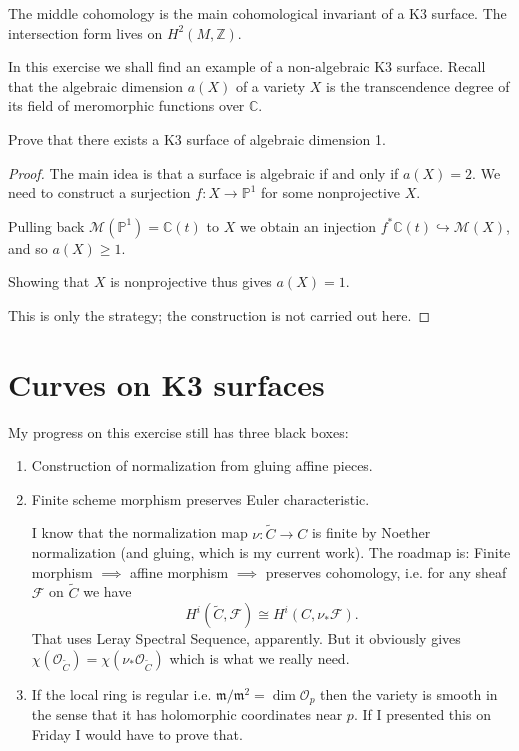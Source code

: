 \begin{remark}
The middle cohomology is the main
cohomological invariant of a K3
surface.
The intersection form lives on
$H^2(M,\mathbb{Z})$.
\end{remark}

\medskip\noindent
In this exercise we shall find
an example of a non-algebraic K3 surface.
Recall that the algebraic dimension $a(X)$
of a variety $X$ is the transcendence
degree of its field of meromorphic
functions over $\mathbb{C}$.

\begin{exercise}
\label{exercise-k3-algebraic-dimension}
Prove that there exists a K3 surface
of algebraic dimension 1.
\end{exercise}

\begin{proof}
The main idea is that a surface
is algebraic if and only if $a(X) = 2$.
We need to construct a surjection
$f:X \to \mathbb{P}^1$
for some nonprojective $X$.

Pulling back
$\mathcal{M}(\mathbb{P}^1)=\mathbb{C}(t)$
to $X$ we obtain an injection
$f^*\mathbb{C}(t)\hookrightarrow\mathcal{M}(X)$,
and so $a(X) \geq 1$.

Showing that $X$ is nonprojective
thus gives $a(X) = 1$.

This is only the strategy; the
construction is not carried out here.
\end{proof}

\section{Curves on K3 surfaces}
\label{section-curves-on-k3}

\noindent
My progress on this
exercise still has three black boxes:
\begin{enumerate}
\item Construction of normalization
from gluing affine pieces.
\item Finite scheme morphism preserves Euler
characteristic.
 
I know that the normalization map 
$\nu:\widetilde C\to C$
is finite by Noether normalization
(and gluing, which is my current work).
The roadmap is:
Finite morphism $\implies$
affine morphism $\implies$
preserves cohomology, i.e.
for any sheaf $\mathcal{F}$ on
$\widetilde C$ we have
$$
H^i(\widetilde C, \mathcal{F})
\cong H^i(C,\nu_*\mathcal{F}).
$$
That uses Leray Spectral Sequence,
apparently.
But it obviously gives
$\chi(\mathcal{O}_{\widetilde{C}})
=\chi (\nu_*\mathcal{O}_{\widetilde{C}})$
which is what we really need.
\item If the local ring is regular
i.e. $\mathfrak{m}/\mathfrak{m}^2
=\dim \mathcal{O}_p$
then the variety is smooth
in the sense that it has 
holomorphic coordinates near $p$.
If I presented this on Friday I would have to
prove that.
\end{enumerate}

